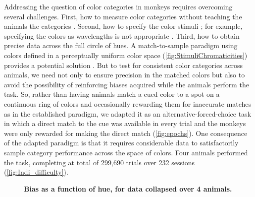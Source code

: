 Addressing the question of color categories in monkeys requires overcoming several challenges. 
First, how to measure color categories without teaching the animals the categories%
. 
Second, how to specify the color stimuli %
; for example, specifying the colors as wavelengths%
is not appropriate %
. 
Third, how to obtain precise data across the full circle of hues. A match-to-sample paradigm using colors defined in a perceptually uniform color space (\autoref{fig:StimuliChromaticities}) provides a potential solution
. 
But to test for consistent color categories across animals, we need not only to ensure precision in the matched colors but also to avoid the possibility of reinforcing biases acquired while the animals perform the task. 
So, rather than having animals match a cued color to a spot on a continuous ring of colors and occasionally rewarding them for inaccurate matches as in the established paradigm, we adapted it as an alternative-forced-choice task in which a direct match to the cue was available in every trial and the monkeys were only rewarded for making the direct match (\autoref{fig:epochs}). 
One consequence of the adapted paradigm is that it requires considerable data to satisfactorily sample category performance across the space of colors. 
Four animals performed the task, completing at total of 299,690 trials over 232 sessions (\autoref{fig:Indi_difficulty}).

\begin{figure}
    \centering
        \begin{subfigure}[t]{0.36\textwidth}
         \centering
         \caption{}
         
         \label{fig:CombinedLinear}
    \end{subfigure}
    \hfill
    \begin{subfigure}[t]{0.36\textwidth}
         \centering
         \caption{}
         
         \label{fig:CombinedLinear}
    \end{subfigure}
    \hfill
    \begin{subfigure}[t]{0.25\textwidth}
         \centering
         \caption{}
         
         \label{fig:CombinedPolar}
    \end{subfigure}
    \caption{\textbf{Bias as a function of hue, for data collapsed over 4 animals.} 
    }
    \label{fig:AvResults}
\end{figure}

